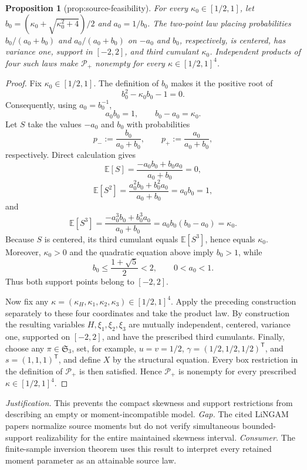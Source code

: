 \documentclass{article}
\newtheorem{proposition}{Proposition}
\begin{document}
\begin{proposition}[prop:source-feasibility]\label{prop:source-feasibility}
For every \(\kappa_0\in[1/2,1]\), let \(b_0=(\kappa_0+\sqrt{\kappa_0^2+4})/2\) and \(a_0=1/b_0\). The two-point law placing probabilities \(b_0/(a_0+b_0)\) and \(a_0/(a_0+b_0)\) on \(-a_0\) and \(b_0\), respectively, is centered, has variance one, support in \([-2,2]\), and third cumulant \(\kappa_0\). Independent products of four such laws make \(\mathcal P_+\) nonempty for every \(\kappa\in[1/2,1]^4\).
\end{proposition}
\begin{proof}
Fix \(\kappa_0\in[1/2,1]\).  The definition of \(b_0\) makes it the positive root of
\[
b_0^2-\kappa_0b_0-1=0.
\]
Consequently, using \(a_0=b_0^{-1}\),
\[
a_0b_0=1,
\qquad
b_0-a_0=\kappa_0.
\]
Let \(S\) take the values \(-a_0\) and \(b_0\) with probabilities
\[
p_-:=\frac{b_0}{a_0+b_0},
\qquad
p_+:=\frac{a_0}{a_0+b_0},
\]
respectively.  Direct calculation gives
\[
\mathbb E[S]
=\frac{-a_0b_0+b_0a_0}{a_0+b_0}=0,
\]
\[
\mathbb E[S^2]
=\frac{a_0^2b_0+b_0^2a_0}{a_0+b_0}
=a_0b_0=1,
\]
and
\[
\mathbb E[S^3]
=\frac{-a_0^3b_0+b_0^3a_0}{a_0+b_0}
=a_0b_0(b_0-a_0)
=\kappa_0.
\]
Because \(S\) is centered, its third cumulant equals \(\mathbb E[S^3]\), hence equals \(\kappa_0\).  Moreover, \(\kappa_0>0\) and the quadratic equation above imply \(b_0>1\), while
\[
b_0\le \frac{1+\sqrt5}{2}<2,
\qquad
0<a_0<1.
\]
Thus both support points belong to \([-2,2]\).

Now fix any \(\kappa=(\kappa_H,\kappa_1,\kappa_2,\kappa_3)\in[1/2,1]^4\).  Apply the preceding construction separately to these four coordinates and take the product law.  By construction the resulting variables \(H,\xi_1,\xi_2,\xi_3\) are mutually independent, centered, variance one, supported on \([-2,2]\), and have the prescribed third cumulants.  Finally, choose any \(\pi\in\mathfrak S_3\), set, for example, \(u=v=1/2\), \(\gamma=(1/2,1/2,1/2)^{\mathsf T}\), and \(s=(1,1,1)^{\mathsf T}\), and define \(X\) by the structural equation.  Every box restriction in the definition of \(\mathcal P_+\) is then satisfied.  Hence \(\mathcal P_+\) is nonempty for every prescribed \(\kappa\in[1/2,1]^4\).
\end{proof}
\par\smallskip\noindent \textit{Justification.} This prevents the compact skewness and support restrictions from describing an empty or moment-incompatible model. \textit{Gap.} The cited LiNGAM papers normalize source moments but do not verify simultaneous bounded-support realizability for the entire maintained skewness interval. \textit{Consumer.} The finite-sample inversion theorem uses this result to interpret every retained moment parameter as an attainable source law.
\end{document}
